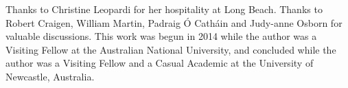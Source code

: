 \documentclass[12pt,a4paper]{article}
\begin{document}
Thanks to Christine Leopardi for her hospitality at Long Beach.
Thanks to Robert Craigen, William Martin,
Padraig {\'O} Cath{\'a}in and Judy-anne Osborn for valuable discussions.
This work was begun in 2014 while the author was a Visiting Fellow at the Australian National University, 
and concluded while the author was a Visiting Fellow and a Casual Academic at the University of Newcastle, Australia.




%

%


\end{document}
